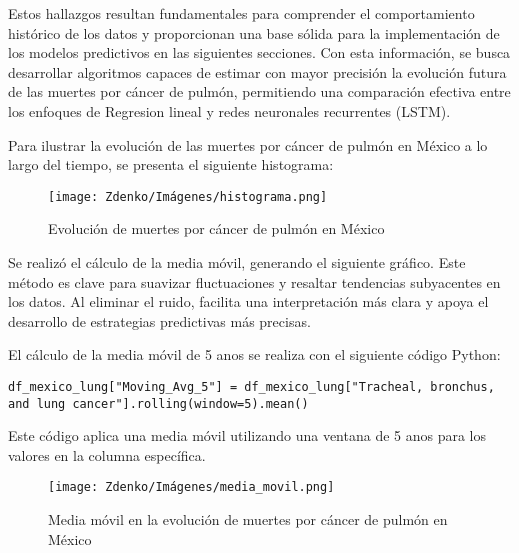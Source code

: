 Estos hallazgos resultan fundamentales para comprender el comportamiento histórico de los datos y proporcionan una base sólida para la implementación de los modelos predictivos en las siguientes secciones. Con esta información, se busca desarrollar algoritmos capaces de estimar con mayor precisión la evolución futura de las muertes por cáncer de pulmón, permitiendo una comparación efectiva entre los enfoques de Regresion lineal y redes neuronales recurrentes (LSTM).

Para ilustrar la evolución de las muertes por cáncer de pulmón en México a lo largo del tiempo, se presenta el siguiente histograma:

\begin{figure}[h] \centering \texttt{[image: Zdenko/Imágenes/histograma.png]} \caption{Evolución de muertes por cáncer de pulmón en México} \label{fig:histograma_pulmon} \end{figure}

Se realizó el cálculo de la media móvil, generando el siguiente gráfico. Este método es clave para suavizar fluctuaciones y resaltar tendencias subyacentes en los datos. Al eliminar el ruido, facilita una interpretación más clara y apoya el desarrollo de estrategias predictivas más precisas.


El cálculo de la media móvil de 5 anos se realiza con el siguiente código Python:

\begin{lstlisting}
df_mexico_lung["Moving_Avg_5"] = df_mexico_lung["Tracheal, bronchus, and lung cancer"].rolling(window=5).mean()
\end{lstlisting}

Este código aplica una media móvil utilizando una ventana de 5 anos para los valores en la columna específica.

\begin{figure}[h] \centering \texttt{[image: Zdenko/Imágenes/media\_movil.png]} \caption{Media móvil en la evolución de muertes por cáncer de pulmón en México} \label{fig:media_movil} \end{figure}

